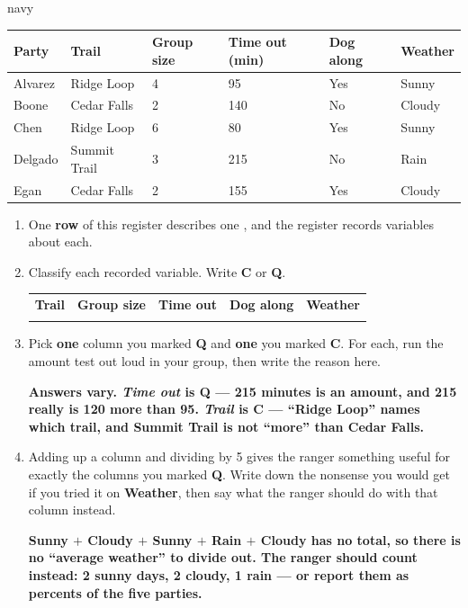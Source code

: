 \documentclass[10pt]{article}
\newcommand{\answerspace}[2]{\par\nopagebreak\noindent\begin{minipage}[t][#1][t]{\linewidth}%
  \color{keyred}\bfseries #2\end{minipage}\par}
\begin{document}
\boxguard[28]
\begin{scenariobox}{navy}
\small
\renewcommand{\arraystretch}{1.1}
\begin{tabularx}{\linewidth}{@{} l Y Y Y Y Y @{}}
\textbf{Party} & \textbf{Trail} & \textbf{Group size} & \textbf{Time out (min)} &
\textbf{Dog along} & \textbf{Weather} \\
\hline
Alvarez  & Ridge Loop   & 4 &  95 & Yes & Sunny  \\
Boone    & Cedar Falls  & 2 & 140 & No  & Cloudy \\
Chen     & Ridge Loop   & 6 &  80 & Yes & Sunny  \\
Delgado  & Summit Trail & 3 & 215 & No  & Rain   \\
Egan     & Cedar Falls  & 2 & 155 & Yes & Cloudy \\
\hline
\end{tabularx}

\vspace{6pt}
\begin{enumerate}[label=\textbf{\alph*.}, leftmargin=1.8em, itemsep=5pt]
  \item One \textbf{row} of this register describes one , and the register
        records  variables about each.
  \item Classify each recorded variable. Write \textbf{C} or \textbf{Q}.

        \vspace{3pt}
        \renewcommand{\arraystretch}{1.3}
        \begin{tabularx}{\linewidth}{@{} Y Y Y Y Y @{}}
        \textbf{Trail} & \textbf{Group size} & \textbf{Time out} & \textbf{Dog along} &
        \textbf{Weather} \\
         &  &  &  &  \\
        \end{tabularx}
  \item Pick \textbf{one} column you marked \textbf{Q} and \textbf{one} you marked \textbf{C}.
        For each, run the amount test out loud in your group, then write the reason here.
        \answerspace{1.5cm}{Answers vary. \emph{Time out} is Q --- 215 minutes is an amount, and
        215 really is 120 more than 95. \emph{Trail} is C --- ``Ridge Loop'' names which trail,
        and Summit Trail is not ``more'' than Cedar Falls.}
  \item Adding up a column and dividing by 5 gives the ranger something useful for exactly the
        columns you marked \textbf{Q}. Write down the nonsense you would get if you tried it on
        \textbf{Weather}, then say what the ranger should do with that column instead.
        \answerspace{1.5cm}{Sunny $+$ Cloudy $+$ Sunny $+$ Rain $+$ Cloudy has no total, so
        there is no ``average weather'' to divide out. The ranger should \textbf{count} instead:
        2 sunny days, 2 cloudy, 1 rain --- or report them as percents of the five parties.}
\end{enumerate}
\end{scenariobox}
\end{document}

